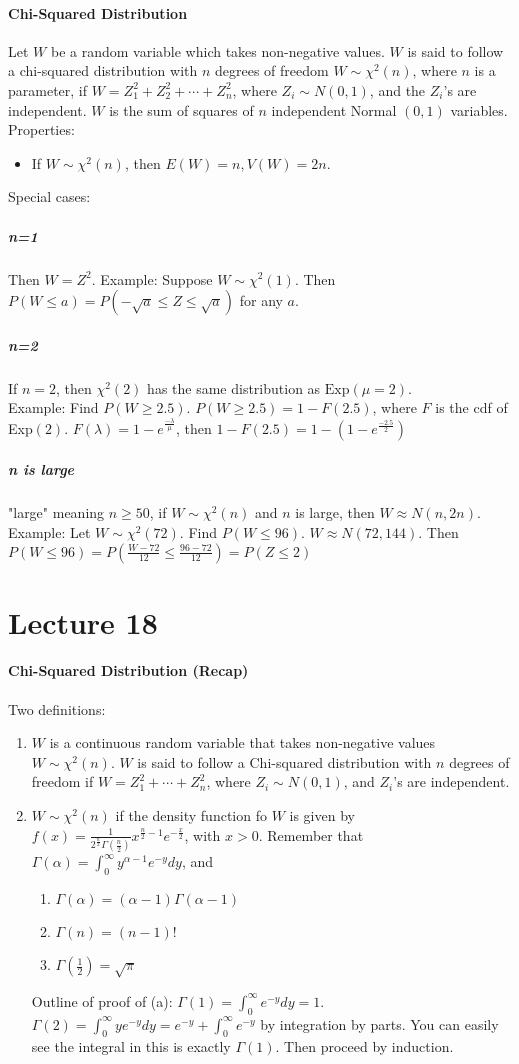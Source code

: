 \documentclass[10pt,letter]{article}
\theoremstyle{plain}
\theoremstyle{definition}
\begin{document}
\paragraph{Chi-Squared Distribution}
Let $W$ be a random variable which takes non-negative values. $W$ is said to follow a chi-squared distribution with $n$ degrees of freedom $W\sim\chi^2(n)$, where $n$ is a parameter, if $W=Z_1^2+Z_2^2+\cdots+Z_n^2$, where $Z_i\sim N(0,1)$, and the $Z_i$'s are independent. $W$ is the sum of squares of $n$ independent Normal $(0,1)$ variables. Properties: 
\begin{itemize}
    \item If $W\sim\chi^2(n)$, then $E(W)=n,V(W)=2n$. 
\end{itemize}
Special cases:
\subparagraph{n=1}
Then $W=Z^2$. Example: Suppose $W\sim \chi^2(1)$. Then $P(W\leq a)=P(-\sqrt{a}\leq Z\leq \sqrt{a})$ for any $a$. 
\subparagraph{n=2}
If $n=2$, then $\chi^2(2)$ has the same distribution as $\text{Exp}(\mu=2)$. \\ 
Example: Find $P(W\geq2.5)$. $P(W\geq2.5)=1-F(2.5)$, where $F$ is the cdf of Exp$(2)$. $F(\lambda)=1-e^{\frac{-\lambda}{\mu}}$, then $1-F(2.5)=1-(1-e^{\frac{-2.5}{2}})$
\subparagraph{n is large}
"large" meaning $n\geq50$, if $W\sim\chi^2(n)$ and $n$ is large, then $W\approx N(n,2n)$. \\ 
Example: Let $W\sim\chi^2(72)$. Find $P(W\leq96)$. $W\approx N(72,144)$. Then $P(W\leq96)=P\left(\frac{W-72}{12}\leq\frac{96-72}{12}\right)=P(Z\leq2)$


\section*{Lecture 18}
\paragraph{Chi-Squared Distribution (Recap)}
Two definitions:
\begin{enumerate}
    \item $W$ is a continuous random variable that takes non-negative values $W\sim\chi^2(n)$. $W$ is said to follow a Chi-squared distribution with $n$ degrees of freedom if $W=Z_1^2+\cdots+Z_n^2$, where $Z_i\sim N(0,1)$, and $Z_i$'s are independent. 
    \item $W\sim\chi^2(n)$ if the density function fo $W$ is given by $f(x)=\frac{1}{2^{\frac{n}{2}}\Gamma\left(\frac{n}{2}\right)}x^{\frac{n}{2}-1}e^{-\frac{x}{2}}$, with $x>0$. Remember that $\Gamma(\alpha)=\int_0^\infty y^{\alpha-1}e^{-y}dy$, and \begin{enumerate}
        \item $\Gamma(\alpha)=(\alpha-1)\Gamma(\alpha-1)$ 
        \item $\Gamma(n)=(n-1)!$ 
        \item $\Gamma\left(\frac{1}{2}\right)=\sqrt{\pi}$
    \end{enumerate}
    Outline of proof of (a): $\Gamma(1)=\int_0^\infty e^{-y}dy=1$. $\Gamma(2)=\int_0^\infty ye^{-y}dy=e^{-y}+\int_0^\infty e^{-y}$ by integration by parts. You can easily see the integral in this is exactly $\Gamma(1)$. Then proceed by induction. 
\end{enumerate}
\end{document}
